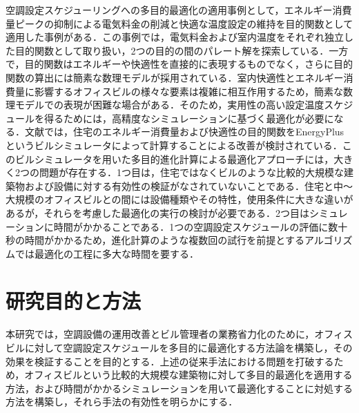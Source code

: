 空調設定スケジューリングへの多目的最適化の適用事例として，エネルギー消費量ピークの抑制による電気料金の削減と快適な温度設定の維持を目的関数として適用した事例がある\cite{Zhang14}．この事例では，電気料金および室内温度をそれぞれ独立した目的関数として取り扱い，2つの目的の間のパレート解を探索している．一方で，目的関数はエネルギーや快適性を直接的に表現するものでなく，さらに目的関数の算出には簡素な数理モデルが採用されている．室内快適性とエネルギー消費量に影響するオフィスビルの様々な要素は複雑に相互作用するため，簡素な数理モデルでの表現が困難な場合がある．そのため，実用性の高い設定温度スケジュールを得るためには，高精度なシミュレーションに基づく最適化が必要になる．文献\cite{Bingham17, Pan16}では，住宅のエネルギー消費量および快適性の目的関数をEnergyPlusというビルシミュレータによって計算することによる改善が検討されている．このビルシミュレータを用いた多目的進化計算による最適化アプローチには，大きく2つの問題が存在する．1つ目は，住宅ではなくビルのような比較的大規模な建築物および設備に対する有効性の検証がなされていないことである．住宅と中～大規模のオフィスビルとの間には設備種類やその特性，使用条件に大きな違いがあるが，それらを考慮した最適化の実行の検討が必要である．2つ目はシミュレーションに時間がかかることである．1つの空調設定スケジュールの評価に数十秒の時間がかかるため，進化計算のような複数回の試行を前提とするアルゴリズムでは最適化の工程に多大な時間を要する．

\section{研究目的と方法}
本研究では，空調設備の運用改善とビル管理者の業務省力化のために，オフィスビルに対して空調設定スケジュールを多目的に最適化する方法論を構築し，その効果を検証することを目的とする．上述の従来手法における問題を打破するため，オフィスビルという比較的大規模な建築物に対して多目的最適化を適用する方法，および時間がかかるシミュレーションを用いて最適化することに対処する方法を構築し，それら手法の有効性を明らかにする．


